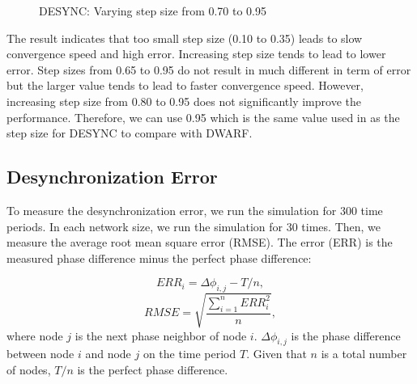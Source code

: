 \begin{figure}
{	\label{fig:alpha085}}
    \hspace{8pt}%
\caption{DESYNC: Varying step size from 0.70 to 0.95}%
\label{fig:desync-vary-large}%
\lofcont
\end{figure}

The result indicates that too small step size (0.10 to 0.35) leads to slow convergence speed and high error.
Increasing step size tends to lead to lower error. Step sizes from 0.65 to 0.95 do not result in much different in term of error but the larger value tends to lead to faster convergence speed.
However, increasing step size from 0.80 to 0.95 does not significantly improve the performance. Therefore, we can use 0.95  which is the same value used in \cite{4379660} as the step size for DESYNC to compare with DWARF.

\subsection{Desynchronization Error}
\label{sec:error}
To measure the desynchronization error, we run the simulation for 300 time periods. 
In each network size, we run the simulation for 30 times.
Then, we measure the average root mean square error (RMSE). The error (ERR) is the measured phase difference minus the perfect phase difference:

\begin{equation}
ERR_i = \Delta \phi_{i,j} - T/n, \nonumber
\end{equation}
\begin{equation}
RMSE = \sqrt{\frac{\sum_{i = 1}^{n}{ERR_i^2}}{n}}, \nonumber
\end{equation}
where node $j$ is the next phase neighbor of node $i$.
$\Delta \phi_{i,j}$ is the phase difference between node $i$ and node $j$ on the time period $T$.
Given that $n$ is a total number of nodes, $T/n$ is the perfect phase difference.

